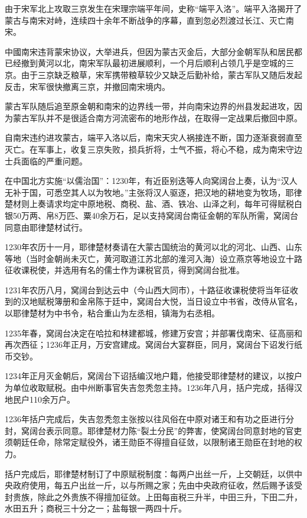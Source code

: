 由于宋军北上攻取三京发生在宋理宗端平年间，史称“端平入洛”。端平入洛揭开了蒙古与南宋对峙，连续四十余年不断战争的序幕，直到忽必烈渡过长江、灭亡南宋。

中國南宋违背蒙宋协议，大举进兵，但因为蒙古灭金后，大部分金朝军队和居民都已经撤到黄河以北，南宋军队最初进展顺利，一个月后顺利占领几乎是空城的三京。由于三京缺乏粮草，宋军携带粮草较少又缺乏后勤补给，蒙古军队又随后发起反击，宋军很快撤离三京，并撤回南宋境内。

蒙古军队随后追至原金朝和南宋的边界线一带，并向南宋边界的州县发起进攻，因为蒙古军队并不是很适合南方河流密布的地形作战，在取得一定战果后撤回中原。

自南宋违约进攻蒙古，端平入洛以后，南宋天灾人祸接连不断，国力逐渐衰弱直至灭亡。在军事上，收复三京失败，损兵折将，士气不振，将心不稳，成为南宋守边士兵面临的严重问题。

在中国北方实施“以儒治国”：1230年，有近臣别迭等人向窝阔台上奏，认为“汉人无补于国，可悉空其人以为牧地。”主张将汉人驱逐，把汉地的耕地变为牧场，耶律楚材则上奏请求均定中原地税、商税、盐、酒、铁冶、山泽之利，每年可得赋税白银50万两、帛8万匹、粟40余万石，足以支持窝阔台南征金朝的军队所需，窝阔台同意由耶律楚材试行。

1230年农历十一月，耶律楚材奏请在大蒙古国统治的黄河以北的河北、山西、山东等地（当时金朝尚未灭亡，黄河取道江苏北部的淮河入海）设立燕京等地设立十路征收课税使，并选用有名的儒士作为课税官员，得到窝阔台批准。

1231年农历八月，窝阔台到达云中（今山西大同市），十路征收课税使将当年征收到的汉地赋税簿册和金帛陈于廷中，窝阔台大悦，当日设立中书省，改侍从官名，以耶律楚材为中书令，粘合重山为左丞相，镇海为右丞相。

1235年春，窝阔台决定在哈拉和林建都城，修建万安宫；并部署伐南宋、征高丽和再次西征；1236年正月，万安宫建成。窝阔台大宴群臣，同月，窝阔台下诏发行纸币交钞。

1234年正月灭金朝后，窝阔台下诏括编汉地户籍，他接受耶律楚材的建议，以按户为单位收取赋税。由中州断事官失吉忽秃忽主持。1236年八月，括户完成，括得汉地民户110余万户。

1236年括户完成后，失吉忽秃忽主张按以往风俗在中原对诸王和有功之臣进行分封，窝阔台表示同意。耶律楚材力陈“裂土分民”的弊害，使窝阔台同意封地的官吏须朝廷任命，除常定赋役外，诸王勋臣不得擅自征敛，以限制诸王勋臣在封地的权力。

括户完成后，耶律楚材制订了中原赋税制度：每两户出丝一斤，上交朝廷，以供中央政府使用，每五户出丝一斤，以与所赐之家；先由中央政府征收，然后赐予该受封贵族，除此之外贵族不得擅加征敛。上田每亩税三升半，中田三升，下田二升，水田五升；商税三十分之一；盐每银一两四十斤。

